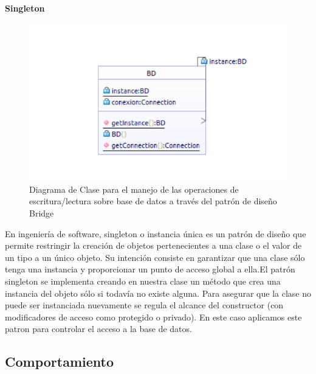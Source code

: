 \paragraph{Singleton}
\begin{figure}[H]
	\centering
	\includegraphics[width=1\linewidth]{parte2/imgs/Patrones/Singleton}
	\caption[Diagrama de clases del patrón Singleton]{Diagrama de Clase para el manejo de las operaciones de escritura/lectura sobre base de datos a través del patrón de diseño Bridge}
	\label{fig:puente}
\end{figure}

En ingeniería de software, singleton o instancia única es un patrón de diseño que permite restringir la creación de objetos pertenecientes a una clase o el valor de un tipo a un único objeto. Su intención consiste en garantizar que una clase sólo tenga una instancia y proporcionar un punto de acceso global a ella.El patrón singleton se implementa creando en nuestra clase un método que crea una instancia del objeto sólo si todavía no existe alguna. Para asegurar que la clase no puede ser instanciada nuevamente se regula el alcance del constructor (con modificadores de acceso como protegido o privado). En este caso aplicamos este patron para controlar el acceso a la base de datos.

\subsection{Comportamiento}

